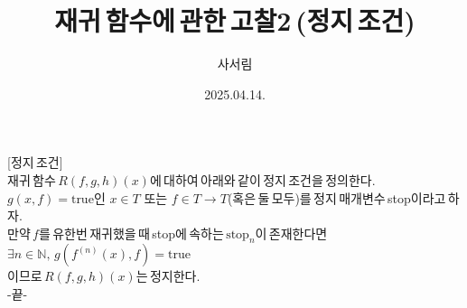 \documentclass{article}
\title{재귀\,함수에\,관한\,고찰2\,(정지\,조건)}
\author{사서림}
\date{2025.04.14.}
\begin{document}
\maketitle

\newpage

[정지\,조건]\\
재귀\,함수\,$R(f,g,h)(x)$에\,대하여\,아래와\,같이\,정지\,조건을\,정의한다.\\

$g(x,f)=\text{true}$인 $x \in T$ 또는 $f \in T \rightarrow T$(혹은\,둘\,모두)를\,정지\,매개변수\,stop이라고\,하자.\\
만약\,$f$를\,유한번\,재귀했을\,때\,stop에\,속하는\,$\text{stop}_n$이\,존재한다면\\
$\exists n \in \mathbb{N},\,g(f^{(n)}(x),f)=\text{true}$\\
이므로\,$R(f,g,h)(x)$는\,정지한다.\\

-끝-
\end{document}
